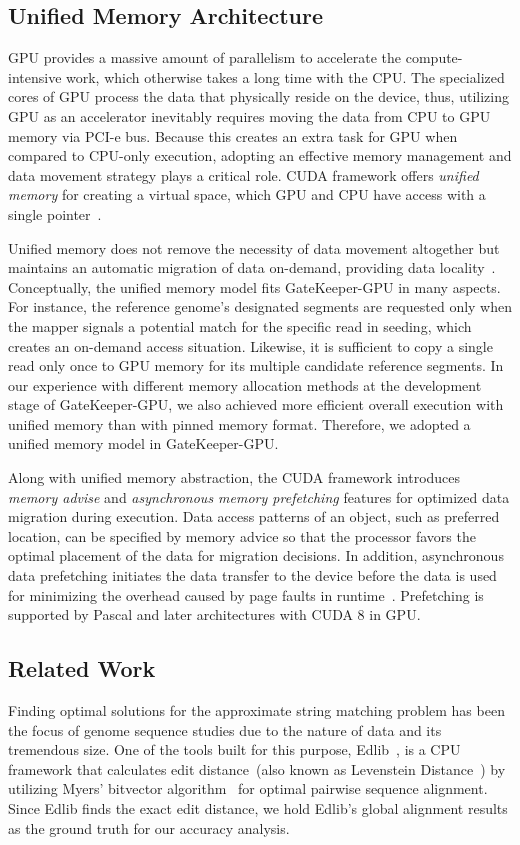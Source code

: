 \subsection{Unified Memory Architecture}
GPU provides a massive amount of parallelism to accelerate the compute-intensive work, which otherwise takes a long time with the CPU. The specialized cores of GPU process the data that physically reside on the device, thus, utilizing GPU as an accelerator inevitably requires moving the data from CPU to GPU memory via PCI-e bus. Because this creates an extra task for GPU when compared to CPU-only execution, adopting an effective memory management and data movement strategy plays a critical role. CUDA framework offers \textit{unified memory} for creating a virtual space, which GPU and CPU have access with a single pointer~\cite{harris_2018_unified}.

Unified memory does not remove the necessity of data movement altogether but maintains an automatic migration of data on-demand, providing data locality~\cite{harris_2018_unified}. Conceptually, the unified memory model fits GateKeeper-GPU in many aspects. For instance, the reference genome's designated segments are requested only when the mapper signals a potential match for the specific read in seeding, which creates an on-demand access situation. Likewise, it is sufficient to copy a single read only once to GPU memory for its multiple candidate reference segments. In our experience with different memory allocation methods at the development stage of GateKeeper-GPU, we also achieved more efficient overall execution with unified memory than with pinned memory format. Therefore, we adopted a unified memory model in GateKeeper-GPU.

Along with unified memory abstraction, the CUDA framework introduces \textit{memory advise} and \textit{asynchronous memory prefetching} features for optimized data migration during execution. Data access patterns of an object, such as preferred location, can be specified by memory advice so that the processor favors the optimal placement of the data for migration decisions. In addition, asynchronous data prefetching initiates the data transfer to the device before the data is used for minimizing the overhead caused by page faults in runtime~\cite{chien2019performance}. Prefetching is supported by Pascal and later architectures with CUDA 8 in GPU.


\subsection{Related Work}
Finding optimal solutions for the approximate string matching problem has been the focus of genome sequence studies due to the nature of data and its tremendous size. One of the tools built for this purpose, Edlib~\cite{vsovsic2017edlib}, is a CPU framework that calculates edit distance~(also known as Levenstein Distance~\cite{levenshtein1966binary}) by utilizing Myers' bitvector algorithm~\cite{myers1999fast} for optimal pairwise sequence alignment. Since Edlib finds the exact edit distance, we hold Edlib's global alignment results as the ground truth for our accuracy analysis.

